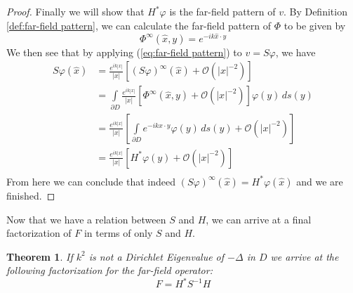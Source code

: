 \documentclass[]{article}
\newtheorem{theorem}{Theorem}
\begin{document}
\begin{proof}
					Finally we will show that $H^\ast \varphi$ is the far-field pattern of $v$. By Definition \ref{def:far-field pattern}, we can calculate the far-field pattern of $\Phi$ to be given by
					\begin{equation}
						\Phi^\infty(\hat x, y) = e^{-ik\hat x\cdot y}
					\end{equation}
					We then see that by applying (\ref{eq:far-field pattern}) to $v =S\varphi$, we have 
					\begin{align}
						S\varphi(\hat x) &= \frac{e^{ik|x|}}{|x|}\left[ (S\varphi)^\infty(\hat x) + \mathcal O(|x|^{-2})\right] \\
						&= \int\limits_{\partial D}\frac{e^{ik|x|}}{|x|}\left[ \Phi^\infty(\hat x, y) + \mathcal O(|x|^{-2})\right] \varphi(y)\, ds(y)\\
						&= \frac{e^{ik|x|}}{|x|}\left[ \int\limits_{\partial D} e^{-ik\hat x\cdot y}\varphi(y)\, ds(y) + \mathcal O(|x|^{-2})\right] \\
						&= \frac{e^{ik|x|}}{|x|}\left[ H^\ast \varphi(y) + \mathcal O(|x|^{-2})\right] \\
					\end{align}
					From here we can conclude that indeed $	(S\varphi)^\infty(\hat x) =H^\ast \varphi(\hat x)$ and we are finished.
				\end{proof}
				Now that we have a relation between $S$ and $H$, we can arrive at a final factorization of $F$ in terms of only $S$ and $H$. 
				\begin{theorem}
					If $k^2$ is not a Dirichlet Eigenvalue of $-\Delta$ in $D$ we arrive at the following factorization for the far-field operator:
					\begin{equation}
						F = H^\ast S^{-1}H
					\end{equation}
				\end{theorem}
\end{document}
